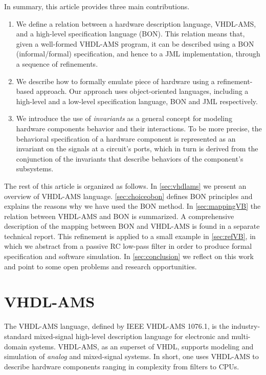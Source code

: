 \documentclass{article}
\begin{document}
In summary, this article provides three main contributions.
\begin{enumerate}
\item We define a relation between a hardware description language,
  VHDL-AMS, and a high-level specification language (BON).  This
  relation means that, given a well-formed VHDL-AMS program, it can be
  described using a BON (informal/formal) specification, and hence to
  a JML implementation, through a sequence of refinements.
\item We describe how to formally emulate piece of hardware using a
  refinement-based approach.  Our approach uses object-oriented
  languages, including a high-level and a low-level specification
  language, BON and JML respectively.
\item We introduce the use of \emph{invariants} as a general concept
  for modeling hardware components behavior and their interactions.
  To be more precise, the behavioral specification of a hardware
  component is represented as an invariant on the signals at a
  circuit's ports, which in turn is derived from the conjunction of
  the invariants that describe behaviors of the component's
  subsystems.
\end{enumerate} 

The rest of this article is organized as follows.  In
\autoref{sec:vhdlams} we present an overview of VHDL-AMS language.
\autoref{sec:choiceobon} defines BON principles and explains the
reasons why we have used the BON method.  In \autoref{sec:mappingVB}
the relation between VHDL-AMS and BON is summarized.  A comprehensive
description of the mapping between BON and VHDL-AMS is found in a
separate technical report.  This refinement is applied to a small
example in \autoref{sec:refVB}, in which we abstract from a passive RC
low-pass filter in order to produce formal specification and software
simulation.  In \autoref{sec:conclusion} we reflect on this work and
point to some open problems and research opportunities.
 
\section{VHDL-AMS}
\label{sec:vhdlams} 

The VHDL-AMS language, defined by IEEE VHDL-AMS 1076.1, is the
industry-standard mixed-signal high-level description language for
electronic and multi-domain systems.  VHDL-AMS, as an superset of
VHDL, supports modeling and simulation of \emph{analog} and
mixed-signal systems.  In short, one uses VHDL-AMS to describe
hardware components ranging in complexity from filters to CPUs.
\end{document}

